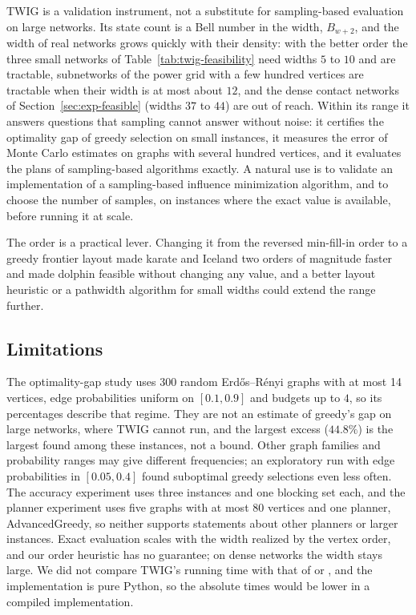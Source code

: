 \documentclass[preprint,11pt]{elsarticle}
\theoremstyle{definition}
\theoremstyle{remark}
\begin{document}
TWIG is a validation instrument, not a substitute for sampling-based evaluation on large networks. Its state count is a Bell number in the width, $B_{w+2}$, and the width of real networks grows quickly with their density: with the better order the three small networks of Table~\ref{tab:twig-feasibility} need widths $5$ to $10$ and are tractable, subnetworks of the power grid with a few hundred vertices are tractable when their width is at most about $12$, and the dense contact networks of Section~\ref{sec:exp-feasible} (widths $37$ to $44$) are out of reach. Within its range it answers questions that sampling cannot answer without noise: it certifies the optimality gap of greedy selection on small instances, it measures the error of Monte Carlo estimates on graphs with several hundred vertices, and it evaluates the plans of sampling-based algorithms exactly. A natural use is to validate an implementation of a sampling-based influence minimization algorithm, and to choose the number of samples, on instances where the exact value is available, before running it at scale.

The order is a practical lever. Changing it from the reversed min-fill-in order to a greedy frontier layout made karate and Iceland two orders of magnitude faster and made dolphin feasible without changing any value, and a better layout heuristic or a pathwidth algorithm for small widths could extend the range further.

\subsection{Limitations}\label{sec:conclusion}

The optimality-gap study uses 300 random Erd\H{o}s--R\'enyi graphs with at most 14 vertices, edge probabilities uniform on $[0.1,0.9]$ and budgets up to $4$, so its percentages describe that regime. They are not an estimate of greedy's gap on large networks, where TWIG cannot run, and the largest excess ($44.8\%$) is the largest found among these instances, not a bound. Other graph families and probability ranges may give different frequencies; an exploratory run with edge probabilities in $[0.05,0.4]$ found suboptimal greedy selections even less often. The accuracy experiment uses three instances and one blocking set each, and the planner experiment uses five graphs with at most $80$ vertices and one planner, AdvancedGreedy, so neither supports statements about other planners or larger instances. Exact evaluation scales with the width realized by the vertex order, and our order heuristic has no guarantee; on dense networks the width stays large. We did not compare TWIG's running time with that of \citet{nakamura2026} or \citet{pozar2026}, and the implementation is pure Python, so the absolute times would be lower in a compiled implementation.
\end{document}
